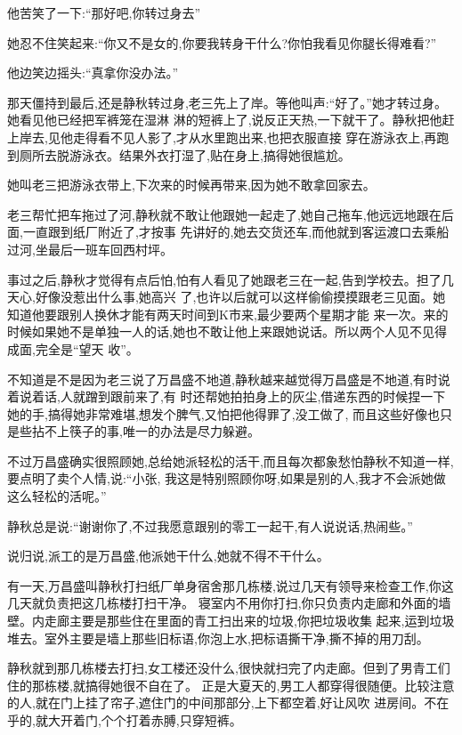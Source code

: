 ﻿\documentclass[12pt]{article}
\begin{document}
他苦笑了一下:``那好吧,你转过身去\myrule ''

她忍不住笑起来:``你又不是女的,你要我转身干什么?你怕我看见你腿\myrule 长得难看?''

他边笑边摇头:``真拿你没办法。''

那天僵持到最后,还是静秋转过身,老三先上了岸。等他叫声:``好了。''她才转过身。她看见他已经把军裤笼在湿淋
淋的短裤上了,说反正天热,一下就干了。静秋把他赶上岸去,见他走得看不见人影了,才从水里跑出来,也把衣服直接
穿在游泳衣上,再跑到厕所去脱游泳衣。结果外衣打湿了,贴在身上,搞得她很尴尬。

她叫老三把游泳衣带上,下次来的时候再带来,因为她不敢拿回家去。

老三帮忙把车拖过了河,静秋就不敢让他跟她一起走了,她自己拖车,他远远地跟在后面,一直跟到纸厂附近了,才按事
先讲好的,她去交货还车,而他就到客运渡口去乘船过河,坐最后一班车回西村坪。

事过之后,静秋才觉得有点后怕,怕有人看见了她跟老三在一起,告到学校去。担了几天心,好像没惹出什么事,她高兴
了,也许以后就可以这样偷偷摸摸跟老三见面。她知道他要跟别人换休才能有两天时间到K市来,最少要两个星期才能
来一次。来的时候如果她不是单独一人的话,她也不敢让他上来跟她说话。所以两个人见不见得成面,完全是``望天
收''。

不知道是不是因为老三说了万昌盛不地道,静秋越来越觉得万昌盛是不地道,有时说着说着话,人就蹭到跟前来了,有
时还帮她拍拍身上的灰尘,借递东西的时候捏一下她的手,搞得她非常难堪,想发个脾气,又怕把他得罪了,没工做了,
而且这些好像也只是些拈不上筷子的事,唯一的办法是尽力躲避。

不过万昌盛确实很照顾她,总给她派轻松的活干,而且每次都象愁怕静秋不知道一样,要点明了卖个人情,说:``小张,
我这是特别照顾你呀,如果是别的人,我才不会派她做这么轻松的活呢。''

静秋总是说:``谢谢你了,不过我愿意跟别的零工一起干,有人说说话,热闹些。''

说归说,派工的是万昌盛,他派她干什么,她就不得不干什么。

有一天,万昌盛叫静秋打扫纸厂单身宿舍那几栋楼,说过几天有领导来检查工作,你这几天就负责把这几栋楼打扫干净。
寝室内不用你打扫,你只负责内走廊和外面的墙壁。内走廊主要是那些住在里面的青工扫出来的垃圾,你把垃圾收集
起来,运到垃圾堆去。室外主要是墙上那些旧标语,你泡上水,把标语撕干净,撕不掉的用刀刮。

静秋就到那几栋楼去打扫,女工楼还没什么,很快就扫完了内走廊。但到了男青工们住的那栋楼,就搞得她很不自在了。
正是大夏天的,男工人都穿得很随便。比较注意的人,就在门上挂了帘子,遮住门的中间那部分,上下都空着,好让风吹
进房间。不在乎的,就大开着门,个个打着赤膊,只穿短裤。
\end{document}

